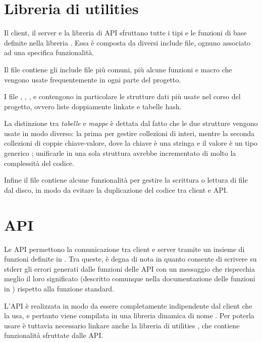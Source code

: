 \documentclass[11pt,oneface]{article}
\begin{document}
\section{Libreria di utilities}
Il client, il server e la libreria di API sfruttano tutte i tipi e le funzioni di base definite nella libreria . Essa è composta da diversi include file, ognuno associato ad una specifica funzionalità.

Il file  contiene gli include file più comuni, più alcune funzioni e macro che vengono usate frequentemente in ogni parte del progetto.

I file , , ,  e  contengono in particolare le strutture dati più usate nel corso del progetto, ovvero liste doppiamente linkate e tabelle hash. 

La distinzione tra \emph{tabelle} e \emph{mappe} è dettata dal fatto che le due strutture vengono usate in modo diverso: la prima per gestire collezioni di interi, mentre la seconda collezioni di coppie chiave-valore, dove la chiave è una stringa e il valore è un tipo generico ; unificarle in una sola struttura avrebbe incrementato di molto la complessità del codice.

Infine il file  contiene alcune funzionalità per gestire la scrittura o lettura di file dal disco, in modo da evitare la duplicazione del codice tra client e API.

\section{API}

Le API permettono la comunicazione tra client e server tramite un insieme di funzioni definite in . Tra queste,  è degna di nota in quanto consente di scrivere su stderr gli errori generati dalle funzioni delle API con un messaggio che rispecchia meglio il loro significato (descritto comunque nella documentazione delle funzioni in ) rispetto alla funzione  standard.

L'API è realizzata in modo da essere completamente indipendente dal client che la usa, e pertanto viene compilata in una libreria dinamica di nome . Per poterla usare è tuttavia necessario linkare anche la libreria di utilities , che contiene funzionalità sfruttate dalle API.
\end{document}

